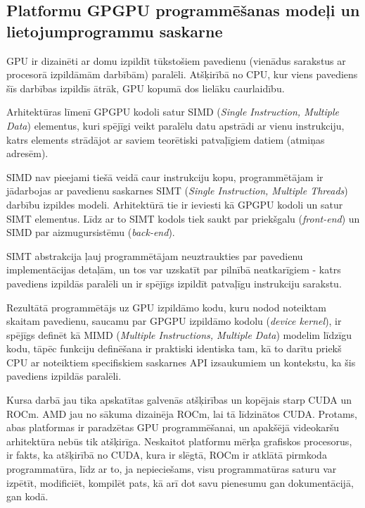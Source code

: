 \begin{center}
    \chapter{Platformu GPGPU programmēšanas modeļi un lietojumprogrammu
    saskarne}
\end{center}

GPU ir dizainēti ar domu izpildīt tūkstošiem pavedienu (vienādus sarakstus ar
procesorā izpildāmām darbībām) paralēli. Atšķirībā no CPU, kur viens pavediens
šīs darbības izpildīs ātrāk, GPU kopumā dos lielāku caurlaidību.

Arhitektūras līmenī GPGPU kodoli satur SIMD (\textit{Single Instruction,
Multiple Data}) elementus, kuri spējīgi veikt paralēlu datu apstrādi ar vienu
instrukciju, katrs elements strādājot ar saviem teorētiski patvaļīgiem datiem
(atmiņas adresēm).

SIMD nav pieejami tiešā veidā caur instrukciju kopu, programmētājam ir
jādarbojas ar pavedienu saskarnes SIMT (\textit{Single Instruction, Multiple
Threads}) darbību izpildes modeli. \cite{GPGPU_gramata} Arhitektūrā tie ir
ieviesti kā GPGPU kodoli un satur SIMT elementus. Līdz ar to SIMT kodols tiek
saukt par priekšgalu (\textit{front-end}) un SIMD par aizmugursistēmu
(\textit{back-end}).

SIMT abstrakcija ļauj programmētājam neuztraukties par pavedienu
implementācijas detaļām, un tos var uzskatīt par pilnībā neatkarīgiem - katrs
pavediens izpildās paralēli un ir spējīgs izpildīt patvaļīgu instrukciju
sarakstu.

Rezultātā programmētājs uz GPU izpildāmo kodu, kuru nodod noteiktam skaitam
pavedienu, saucamu par  GPGPU izpildāmo kodolu (\textit{device kernel}), ir
spējīgs definēt kā MIMD (\textit{Multiple Instructions, Multiple Data}) modelim
līdzīgu kodu, tāpēc funkciju definēšana ir praktiski identiska tam, kā to darītu
priekš CPU ar noteiktiem specifiskiem saskarnes API izsaukumiem un kontekstu,
ka šis pavediens izpildās paralēli. \cite{kursa-darbs}

Kursa darbā jau tika apskatītas galvenās atšķirības un kopējais starp CUDA un
ROCm.\cite{kursa-darbs} AMD jau no sākuma dizainēja ROCm, lai tā līdzinātos
CUDA. Protams, abas platformas ir paradzētas GPU programmēšanai, un apakšējā
videokaršu arhitektūra nebūs tik atšķirīga. Neskaitot platformu mērķa grafiskos
procesorus, ir fakts, ka atšķirībā no CUDA, kura ir slēgtā, ROCm ir atklātā
pirmkoda programmatūra, līdz ar to, ja nepieciešams, visu programmatūras saturu
var izpētīt, modificiēt, kompilēt pats, kā arī dot savu pienesumu gan
dokumentācijā, gan kodā.\cite{what_is_ROCM}

